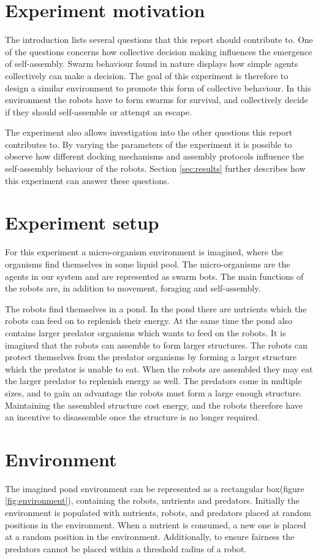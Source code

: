 

\section{Experiment motivation}
The introduction lists several questions that this report should contribute to.
One of the questions concerns how collective decision making influences the emergence of self-assembly.
Swarm behaviour found in nature displays how simple agents collectively can make a decision.
The goal of this experiment is therefore to design a similar environment to promote this form of collective behaviour.
In this environment the robots have to form swarms for survival, and collectively decide if they should self-assemble or attempt an escape.

The experiment also allows investigation into the other questions this report contributes to.
By varying the parameters of the experiment it is possible to observe how different docking mechanisms and assembly protocols influence the self-assembly behaviour of the robots.
Section \ref{sec:results} further describes how this experiment can answer these questions.
\section{Experiment setup}
\label{sec:description}
For this experiment a micro-organism environment is imagined, where the organisms find themselves in some liquid pool. 
The micro-organisms are the agents in our system and are represented as swarm bots.
The main functions of the robots are, in addition to movement, foraging and self-assembly.

The robots find themselves in a pond.
In the pond there are nutrients which the robots can feed on to replenish their energy.
At the same time the pond also contains larger predator organisms which wants to feed on the robots.
It is imagined that the robots can assemble to form larger structures.
The robots can protect themselves from the predator organisms by forming a larger structure which the predator is unable to eat.
When the robots are assembled they may eat the larger predator to replenish energy as well.
The predators come in multiple sizes, and to gain an advantage the robots must form a large enough structure.
Maintaining the assembled structure cost energy, and the robots therefore have an incentive to disassemble once the structure is no longer required.

\section{Environment}
The imagined pond environment can be represented as a rectangular box(figure \ref{fig:environment}), containing the robots, nutrients and predators.
Initially the environment is populated with nutrients, robots, and predators placed at random positions in the environment.
When a nutrient is consumed, a new one is placed at a random position in the environment.
Additionally, to ensure fairness the predators cannot be placed within a threshold radius of a robot. 

